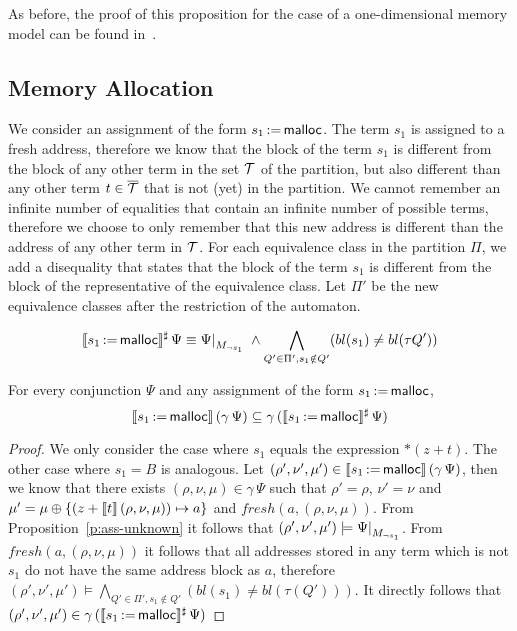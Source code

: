 As before, the proof of this proposition for the case of a one-dimensional memory model can be found in~\cite{2pointer}.

\subsection{Memory Allocation}

We consider an assignment of the form $s_1\,{:=}\,\textsf{malloc}$.
The term $s_1$ is assigned to a fresh address, therefore we know that the block of the term $s_1$ is different from the block of any other term in the set $\mathcal{T}$ of the partition, but also different than any other term $t \in {\overline{\mathcal{T}}}$ that is not (yet) in the partition.
We cannot remember an infinite number of equalities that contain an infinite number of possible terms, therefore we choose to only remember that this new address is different than the address of any other term in $\mathcal{T}$.
For each equivalence class in the partition $\Pi$, we add a disequality that states that the block of the term $s_1$ is different from the block of the representative of the equivalence class.
Let $\Pi'$ be the new equivalence classes after the restriction of the automaton.

\[
	\sem{s_1\,{:=}\,\text{\malloc}}^\sharp\,\Psi \equiv
	\restr{\Psi}{M_{\neg s_1}}\;\land
	\bigwedge_{Q'\in \Pi',s_1\notin Q'}(bl(s_1) \neq bl(\tau Q'))
\]
\begin{proposition}\label{p:ass-malloc}
	For every conjunction $\Psi$ and any assignment of the form $s_1\,{:=}\,\textsf{malloc}$,
	\[
		\llbracket s_1\,{:=}\,\textsf{malloc}\rrbracket\,(\gamma\,\Psi) \subseteq \gamma\,(\llbracket s_1\,{:=}\,\textsf{malloc}\rrbracket^\sharp\,\Psi)
	\]
\end{proposition}
\begin{proof}
	We only consider the case where $s_1$ equals the expression $*(z+t)$.
	The other case where $s_1 = B$ is analogous.
	Let $(\rho',\nu',\mu') \in \llbracket s_1\,{:=}\,\textsf{malloc}\rrbracket\,(\gamma\,\Psi)$, then we know that there exists $(\rho,\nu,\mu) \in \gamma\,\Psi$ such that $\rho'=\rho$, $\nu'=\nu$ and $\mu' =\mu\oplus\{(z+\llbracket t\rrbracket\,(\rho,\nu,\mu))\mapsto a\}$ and $fresh(a, (\rho, \nu, \mu))$.
	From Proposition~\ref{p:ass-unknown} it follows that $(\rho',\nu',\mu') \models \restr{\Psi}{M_{\neg s_1}}$.
	From $fresh(a,( \rho,\nu,\mu))$ it follows that all addresses stored in any term which is not $s_1$ do not have the same address block as $a$, therefore $(\rho',\nu',\mu') \models \bigwedge_{Q'\in \Pi', s_1\notin Q'}(bl(s_1) \neq bl(\tau(Q')))$.
	It directly follows that $(\rho',\nu',\mu') \in \gamma\,(\llbracket s_1\,{:=}\,\textsf{malloc}\rrbracket^\sharp\,\Psi)$
\end{proof}
